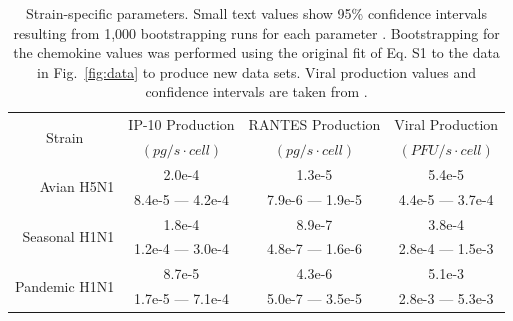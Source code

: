 \documentclass[10pt]{article}
\begin{document}
\begin{table}
\centering
\begin{tabular}{ | r | c | c | c | }
  \hline                        
  \multicolumn{1}{|c|}{\multirow{2}{*}{Strain}} & IP-10 Production & RANTES Production & Viral Production \\
   & \footnotesize{$(pg/s\cdot cell)$}  & \footnotesize{$(pg/s\cdot cell)$} &  \footnotesize{$(PFU/s\cdot cell)$} \\
  \hline
  \multirow{2}{*}{Avian H5N1} & 2.0e-4 &  1.3e-5 & 5.4e-5 \\
   &  \footnotesize{8.4e-5 --- 4.2e-4} & \footnotesize{7.9e-6 --- 1.9e-5} & \footnotesize{4.4e-5 --- 3.7e-4}\\ 
   \hline
  \multirow{2}{*}{Seasonal H1N1} & 1.8e-4 &  8.9e-7 & 3.8e-4 \\
   & \footnotesize{1.2e-4 --- 3.0e-4} & \footnotesize{4.8e-7 --- 1.6e-6} & \footnotesize{2.8e-4 --- 1.5e-3}\\
   \hline
  \multirow{2}{*}{Pandemic H1N1} & 8.7e-5 &  4.3e-6 & 5.1e-3 \\
   & \footnotesize{1.7e-5 --- 7.1e-4} & \footnotesize{5.0e-7 --- 3.5e-5} & \footnotesize{2.8e-3 --- 5.3e-3} \\
  \hline
\end{tabular}
\caption{Strain-specific parameters.  Small text values show 95\% confidence intervals resulting from 1,000 bootstrapping runs for each parameter \cite{Wu1986}.  Bootstrapping for the chemokine values was performed using the original fit of Eq. S1 to the data in Fig.~\ref{fig:data} to produce new data sets.  Viral production values and confidence intervals are taken from \cite{Mitchell2011}.}
\label{tab:strains}
\end{table}
\end{document}
